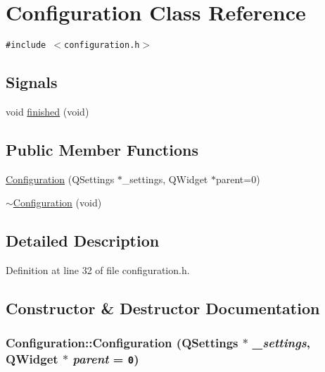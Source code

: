 \hypertarget{class_configuration}{
\section{Configuration Class Reference}
\label{class_configuration}
}
{\tt \#include $<$configuration.h$>$}

\subsection*{Signals}
\begin{CompactItemize}
\item 
void \hyperlink{class_configuration_84909e3f2258ba02ee1120cbbf894348}{finished} (void)
\end{CompactItemize}
\subsection*{Public Member Functions}
\begin{CompactItemize}
\item 
\hyperlink{class_configuration_10b067d764bd7f777e58ddf18ad814d3}{Configuration} (QSettings $\ast$\_\-settings, QWidget $\ast$parent=0)
\item 
\hyperlink{class_configuration_094b6e765719f7a801524abac5e46475}{$\sim$Configuration} (void)
\end{CompactItemize}


\subsection{Detailed Description}


Definition at line 32 of file configuration.h.

\subsection{Constructor \& Destructor Documentation}
\hypertarget{class_configuration_10b067d764bd7f777e58ddf18ad814d3}{
\subsubsection[{Configuration}]{\setlength{\rightskip}{0pt plus 5cm}Configuration::Configuration (QSettings $\ast$ {\em \_\-settings}, \/  QWidget $\ast$ {\em parent} = {\tt 0})}}
\label{class_configuration_10b067d764bd7f777e58ddf18ad814d3}




